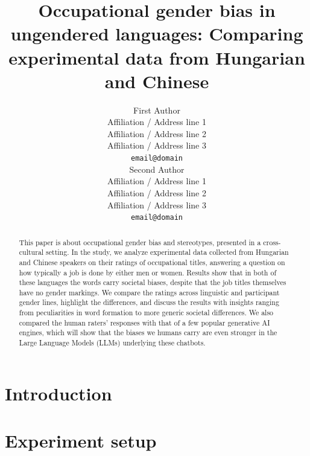 \documentclass[11pt]{article}
\title{Occupational gender bias in ungendered languages: Comparing experimental data from Hungarian and Chinese}
\author{First Author \\
  Affiliation / Address line 1 \\
  Affiliation / Address line 2 \\
  Affiliation / Address line 3 \\
  \texttt{email@domain} \\\And
  Second Author \\
  Affiliation / Address line 1 \\
  Affiliation / Address line 2 \\
  Affiliation / Address line 3 \\
  \texttt{email@domain} \\}
\begin{document}
\maketitle

\begin{abstract}
This paper is about occupational gender bias and stereotypes, presented in a cross-cultural setting. In the study, we analyze experimental data collected from Hungarian and Chinese speakers on their ratings of occupational titles, answering a question on how typically a job is done by either men or women. Results show that in both of these languages the words carry societal biases, despite that the job titles themselves have no gender markings. We compare the ratings across linguistic and participant gender lines, highlight the differences, and discuss the results with insights ranging from peculiarities in word formation to more generic societal differences. We also compared the human raters' responses with that of a few popular generative AI engines, which will show that the biases we humans carry are even stronger in the Large Language Models (LLMs) underlying these chatbots.
\end{abstract}



\section{Introduction}





\section{Experiment setup}

\end{document}
